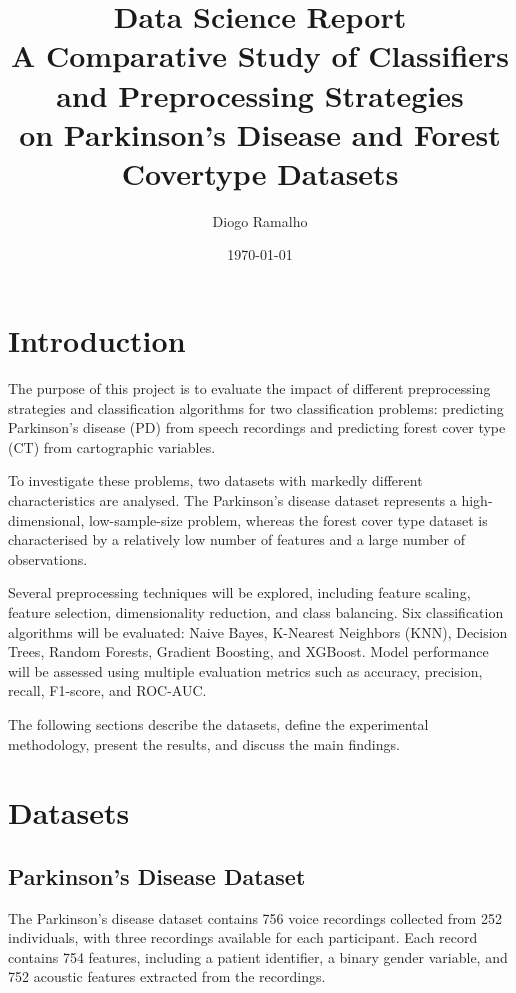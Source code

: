 \documentclass[11pt,a4paper]{article}
\title{
    Data Science Report \\[4pt]
    \large A Comparative Study of Classifiers and Preprocessing Strategies\\
    on Parkinson's Disease and Forest Covertype Datasets
}
\author{Diogo Ramalho}
\date{\today}
\begin{document}
\maketitle

\tableofcontents
\newpage

\section{Introduction}

The purpose of this project is to evaluate the impact of different preprocessing
strategies and classification algorithms for two classification problems:
predicting Parkinson's disease (PD) from speech recordings and predicting forest
cover type (CT) from cartographic variables.

To investigate these problems, two datasets with markedly different
characteristics are analysed. The Parkinson's disease dataset represents a
high-dimensional, low-sample-size problem, whereas the forest cover type dataset
is characterised by a relatively low number of features and a large number of
observations.

Several preprocessing techniques will be explored, including feature scaling,
feature selection, dimensionality reduction, and class balancing. Six
classification algorithms will be evaluated: Naive Bayes, K-Nearest Neighbors
(KNN), Decision Trees, Random Forests, Gradient Boosting, and XGBoost. Model
performance will be assessed using multiple evaluation metrics such as accuracy,
precision, recall, F1-score, and ROC-AUC.

The following sections describe the datasets, define the experimental
methodology, present the results, and discuss the main findings.

\section{Datasets}

\subsection{Parkinson's Disease Dataset}

The Parkinson's disease dataset contains 756 voice recordings collected from
252 individuals, with three recordings available for each participant. Each
record contains 754 features, including a patient identifier, a binary gender
variable, and 752 acoustic features extracted from the recordings.
\end{document}
